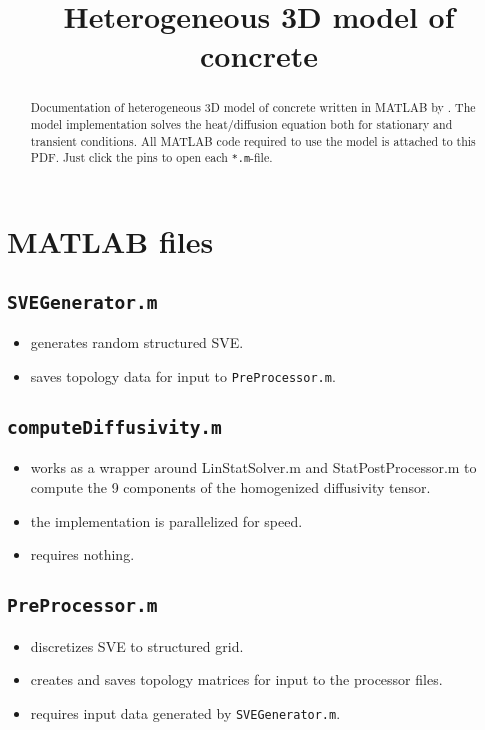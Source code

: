 \documentclass[12pt]{article}
\title{Heterogeneous 3D model of concrete}
\begin{document}
\maketitle

\begin{abstract}
Documentation of heterogeneous 3D model of concrete written in MATLAB by \filip. The model implementation solves the heat/diffusion equation both for stationary and transient conditions. All MATLAB code required to use the model is attached to this PDF. Just click the pins to open each \verb|*.m|-file.
\end{abstract}

\tableofcontents

\newpage

\section{MATLAB files}

\subsection{\texttt{SVEGenerator.m} 
}
\begin{itemize}
\item generates random structured SVE.
\item saves topology data for input to \verb|PreProcessor.m|.
\end{itemize}

\subsection{\texttt{computeDiffusivity.m} 
}
\begin{itemize}
\item works as a wrapper around LinStatSolver.m and StatPostProcessor.m to compute the 9 components of the homogenized diffusivity tensor.
\item the implementation is parallelized for speed.
\item requires nothing.
\end{itemize}

\subsection{\texttt{PreProcessor.m} 
}
\begin{itemize}
\item discretizes SVE to structured grid.
\item creates and saves topology matrices for input to the processor files.
\item requires input data generated by \verb|SVEGenerator.m|.
\end{itemize}
\end{document}
